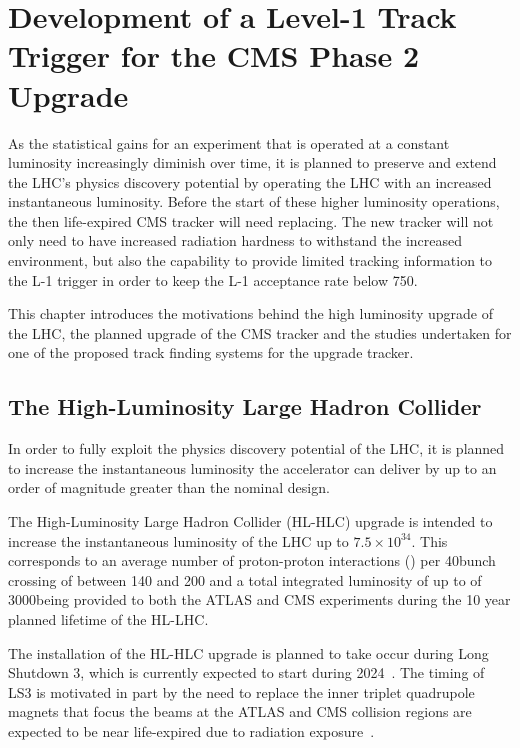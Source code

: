 \chapter{Development of a Level-1 Track Trigger for the CMS Phase 2 Upgrade}\label{chapter:tk-upgrade}
As the statistical gains for an experiment that is operated at a constant luminosity increasingly diminish over time, it is planned to preserve and extend the LHC's physics discovery potential by operating the LHC with an increased instantaneous luminosity.
Before the start of these higher luminosity operations, the then life-expired CMS tracker will need replacing.
The new tracker will not only need to have increased radiation hardness to withstand the increased \PU environment, but also the capability to provide limited tracking information to the L-1 trigger in order to keep the L-1 acceptance rate below 750\kHz.

This chapter introduces the motivations behind the high luminosity upgrade of the LHC, the planned upgrade of the CMS tracker and the studies undertaken for one of the proposed track finding systems for the upgrade tracker.

\section{The High-Luminosity Large Hadron Collider} \label{sec:hl-lhc}
In order to fully exploit the physics discovery potential of the LHC, it is planned to increase the instantaneous luminosity the accelerator can deliver by up to an order of magnitude greater than the nominal design.

The High-Luminosity Large Hadron Collider (HL-HLC) upgrade is intended to increase the instantaneous luminosity of the LHC up  to $7.5 \times {10}^{34}$\percms.
This corresponds to an average number of proton-proton interactions (\PU) per 40\MHz bunch crossing of between 140 and 200 and a total integrated luminosity of up to of 3000\fbinv being provided to both the ATLAS and CMS experiments during the 10 year planned lifetime of the HL-LHC.

The installation of the HL-HLC upgrade is planned to take occur during Long Shutdown 3, which is currently expected to start during 2024~\cite{ApollinariG.:2017ojx}. 
The timing of LS3 is motivated in part by the need to replace the inner triplet quadrupole magnets that focus the beams at the ATLAS and CMS collision regions are expected to be near life-expired due to radiation exposure~\cite{hl-lhc-prelim-design-report,CMSCollaboration:2015zni}.

